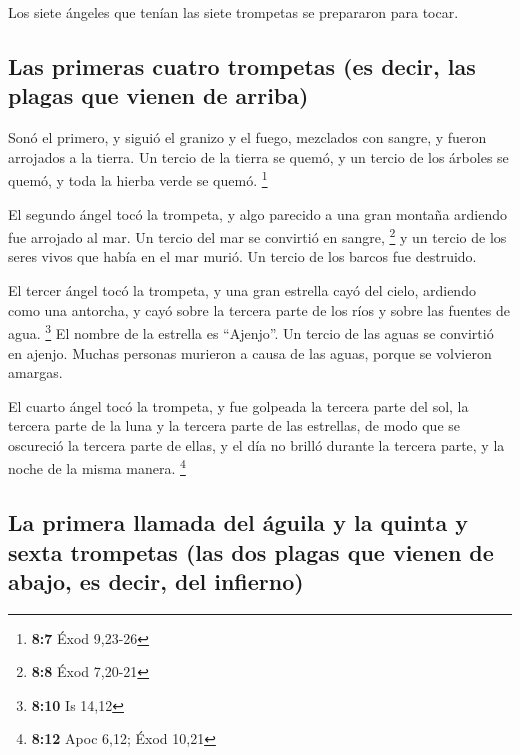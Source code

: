  Los siete ángeles que tenían las siete trompetas se
prepararon para tocar.

\hypertarget{las-primeras-cuatro-trompetas-es-decir-las-plagas-que-vienen-de-arriba}{%
\subsection{Las primeras cuatro trompetas (es decir, las plagas que
vienen de
arriba)}\label{las-primeras-cuatro-trompetas-es-decir-las-plagas-que-vienen-de-arriba}}

 Sonó el primero, y siguió el granizo y el fuego,
mezclados con sangre, y fueron arrojados a la tierra. Un tercio de la
tierra se quemó, y un tercio de los árboles se quemó, y toda la hierba
verde se quemó. \footnote{\textbf{8:7} Éxod 9,23-26}

 El segundo ángel tocó la trompeta, y algo parecido a una
gran montaña ardiendo fue arrojado al mar. Un tercio del mar se
convirtió en sangre, \footnote{\textbf{8:8} Éxod 7,20-21} 
y un tercio de los seres vivos que había en el mar murió. Un tercio de
los barcos fue destruido.

 El tercer ángel tocó la trompeta, y una gran estrella
cayó del cielo, ardiendo como una antorcha, y cayó sobre la tercera
parte de los ríos y sobre las fuentes de agua. \footnote{\textbf{8:10}
  Is 14,12}  El nombre de la estrella es ``Ajenjo''. Un
tercio de las aguas se convirtió en ajenjo. Muchas personas murieron a
causa de las aguas, porque se volvieron amargas.

 El cuarto ángel tocó la trompeta, y fue golpeada la
tercera parte del sol, la tercera parte de la luna y la tercera parte de
las estrellas, de modo que se oscureció la tercera parte de ellas, y el
día no brilló durante la tercera parte, y la noche de la misma manera.
\footnote{\textbf{8:12} Apoc 6,12; Éxod 10,21}

\hypertarget{la-primera-llamada-del-uxe1guila-y-la-quinta-y-sexta-trompetas-las-dos-plagas-que-vienen-de-abajo-es-decir-del-infierno}{%
\subsection{La primera llamada del águila y la quinta y sexta trompetas
(las dos plagas que vienen de abajo, es decir, del
infierno)}\label{la-primera-llamada-del-uxe1guila-y-la-quinta-y-sexta-trompetas-las-dos-plagas-que-vienen-de-abajo-es-decir-del-infierno}}

